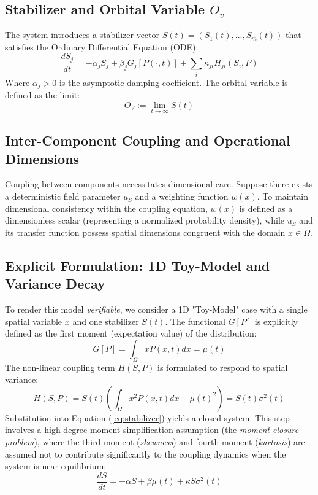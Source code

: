 \documentclass[12pt, a4paper]{article}
\begin{document}
\subsection{Stabilizer and Orbital Variable $O_{v}$}
The system introduces a stabilizer vector $S(t)=(S_{1}(t),...,S_{m}(t))$ that satisfies the Ordinary Differential Equation (ODE):
\begin{equation} \label{eq:stabilizer}
\frac{dS_{j}}{dt}=-\alpha_{j}S_{j}+\beta_{j}G_{j}[P(\cdot,t)]+\sum_{i}\kappa_{ji}H_{ji}(S_{i},P)
\end{equation}
Where $\alpha_{j}>0$ is the asymptotic damping coefficient. The orbital variable is defined as the limit:
\begin{equation}
O_{V}:=\lim_{t\rightarrow\infty}S(t)
\end{equation}

\subsection{Inter-Component Coupling and Operational Dimensions}
Coupling between components necessitates dimensional care. Suppose there exists a deterministic field parameter $u_{S}$ and a weighting function $w(x)$. To maintain dimensional consistency within the coupling equation, $w(x)$ is defined as a dimensionless scalar (representing a normalized probability density), while $u_{S}$ and its transfer function possess spatial dimensions congruent with the domain $x \in \Omega$.

\subsection{Explicit Formulation: 1D Toy-Model and Variance Decay}
To render this model \textit{verifiable}, we consider a 1D "Toy-Model" case with a single spatial variable $x$ and one stabilizer $S(t)$. The functional $G[P]$ is explicitly defined as the first moment (expectation value) of the distribution:
\begin{equation}
G[P] = \int_{\Omega} x P(x,t) dx = \mu(t)
\end{equation}
The non-linear coupling term $H(S,P)$ is formulated to respond to spatial variance:
\begin{equation}
H(S,P) = S(t) \left( \int_{\Omega} x^2 P(x,t) dx - \mu(t)^2 \right) = S(t)\sigma^2(t)
\end{equation}
Substitution into Equation (\ref{eq:stabilizer}) yields a closed system. This step involves a high-degree moment simplification assumption (the \textit{moment closure problem}), where the third moment (\textit{skewness}) and fourth moment (\textit{kurtosis}) are assumed not to contribute significantly to the coupling dynamics when the system is near equilibrium:
\begin{equation}
\frac{dS}{dt} = -\alpha S + \beta \mu(t) + \kappa S \sigma^2(t)
\end{equation}
\end{document}
